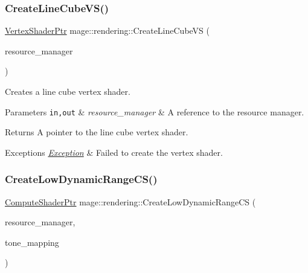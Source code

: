 \subsubsection{\texorpdfstring{Create\+Line\+Cube\+V\+S()}{CreateLineCubeVS()}}
{\footnotesize\ttfamily \mbox{\hyperlink{namespacemage_1_1rendering_aaf704b9c54a4181f4950a1761de69dda}{Vertex\+Shader\+Ptr}} mage\+::rendering\+::\+Create\+Line\+Cube\+VS (\begin{DoxyParamCaption}\item[{\mbox{\hyperlink{classmage_1_1rendering_1_1_resource_manager}{Resource\+Manager}} \&}]{resource\+\_\+manager }\end{DoxyParamCaption})}

Creates a line cube vertex shader.


\begin{DoxyParams}[1]{Parameters}
\mbox{\tt in,out}  & {\em resource\+\_\+manager} & A reference to the resource manager. \\
\hline
\end{DoxyParams}
\begin{DoxyReturn}{Returns}
A pointer to the line cube vertex shader. 
\end{DoxyReturn}

\begin{DoxyExceptions}{Exceptions}
{\em \mbox{\hyperlink{classmage_1_1_exception}{Exception}}} & Failed to create the vertex shader. \\
\hline
\end{DoxyExceptions}
\mbox{\label{namespacemage_1_1rendering_a81a151b15cfd41063b5e5e085ad6d6de}} 
\subsubsection{\texorpdfstring{Create\+Low\+Dynamic\+Range\+C\+S()}{CreateLowDynamicRangeCS()}}
{\footnotesize\ttfamily \mbox{\hyperlink{namespacemage_1_1rendering_ab3dc9f2114f2e9255b91d9c051da52ea}{Compute\+Shader\+Ptr}} mage\+::rendering\+::\+Create\+Low\+Dynamic\+Range\+CS (\begin{DoxyParamCaption}\item[{\mbox{\hyperlink{classmage_1_1rendering_1_1_resource_manager}{Resource\+Manager}} \&}]{resource\+\_\+manager,  }\item[{\mbox{\hyperlink{namespacemage_1_1rendering_a789e4b7d9a8cc831b065e9c6bb7430e9}{Tone\+Mapping}}}]{tone\+\_\+mapping }\end{DoxyParamCaption})}

